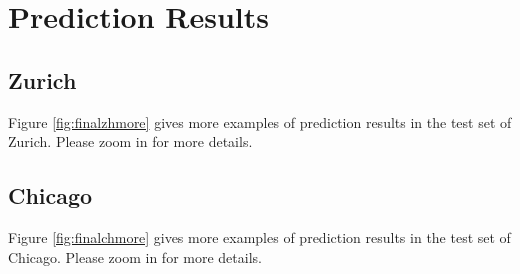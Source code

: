 \chapter{Prediction Results}
\section{Zurich}\label{app:predzh}
Figure \ref{fig:finalzhmore} gives more examples of prediction results in the test set of Zurich. Please zoom in for more details.


\section{Chicago}\label{app:predch}
Figure \ref{fig:finalchmore} gives more examples of prediction results in the test set of Chicago. Please zoom in for more details.
